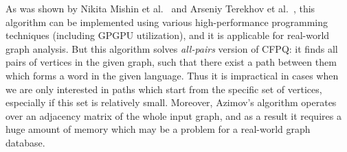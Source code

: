 As was shown by Nikita Mishin et al.~\cite{Mishin:2019:ECP:3327964.3328503} and Arseniy Terekhov et al.~\cite{ 10.1145/3398682.3399163}, this algorithm can be implemented using various high-performance programming techniques (including GPGPU utilization), and it is applicable for real-world graph analysis.
But this algorithm solves \textit{all-pairs} version of CFPQ: it finds all pairs of vertices in the given graph, such that there exist a path between them which forms a word in the given language.
Thus it is impractical in cases when we are only interested in paths which start from the specific set of vertices, especially if this set is relatively small.
Moreover, Azimov's algorithm operates over an adjacency matrix of the whole input graph, and as a result it requires a huge amount of memory which may be a problem for a real-world graph database.

